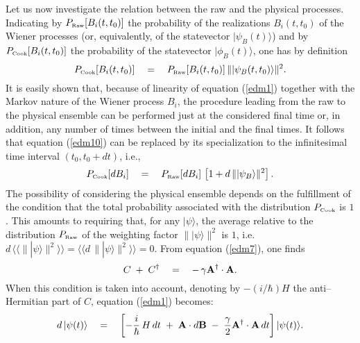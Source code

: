\documentclass[10pt,a4paper]{article}
\newcommand{\llangle}{\langle\!\langle}
\newcommand{\rrangle}{\rangle\!\rangle}
\begin{document}
Let us now investigate the relation between the raw and the
physical processes. Indicating by $P_{\makebox{\tiny
Raw}}[B_{i}(t, t_{0})]$ the probability of the realizations
$B_{i}(t, t_{0})$ of the Wiener processes (or, equivalently, of
the statevector $|\psi_{B}(t)\rangle$) and by $P_{\makebox{\tiny
Cook}}[B_{i}(t,t_{0})]$ the probability of the statevector
$|\phi_{B}(t)\rangle$, one has by definition
\begin{equation} \label{edm10}
P_{\makebox{\tiny Cook}}[B_{i}(t,t_{0})] \quad = \quad
P_{\makebox{\tiny Raw}}[B_{i}(t, t_{0})]\, \| |\psi_{B}(t,
t_{0})\rangle\|^{2}.
\end{equation}
It is easily shown that, because of linearity of equation
(\ref{edm1}) together with the Markov nature of the Wiener process
$B_{i}$, the procedure leading from the raw to the physical
ensemble can be performed just at the considered final time or, in
addition, any number of times between the initial and the final
times. It follows that equation (\ref{edm10}) can be replaced by
its specialization to the infinitesimal time interval $(t_{0},
t_{0} + dt)$, i.e.,
\begin{equation} \label{edm8}
P_{\makebox{\tiny Cook}}[dB_{i}] \quad = \quad P_{\makebox{\tiny
Raw}}[dB_{i}]\, \left[ 1 + d\, \| |\psi_{B}\rangle\|^{2} \right].
\end{equation}
The possibility of considering the physical ensemble depends on
the fulfillment of the condition that the total probability
associated with the distribution $P_{\makebox{\tiny Cook}}$ is
$1$. This amounts to requiring that, for any $|\psi\rangle$, the
average relative to the distribution $P_{\makebox{\tiny Raw}}$ of
the weighting factor $\| |\psi\rangle \|^2$ is $1$, i.e. $d \,
\llangle\| |\psi\rangle \|^2\rrangle = \llangle d \, \|
|\psi\rangle \|^2\rrangle = 0$. From equation (\ref{edm7}), one
finds
\begin{equation} \label{aqnld}
C\; + \; C^{\dagger} \quad = \quad -\, \gamma {\bf
A}^{\dagger}\cdot {\bf A}.
\end{equation}
When this condition is taken into account, denoting by
$-(i/\hbar)H$ the anti--Hermitian part of $C$, equation
(\ref{edm1}) becomes:
\begin{equation} \label{imef}
d\, |\psi(t)\rangle \quad = \quad \left[ -\frac{i}{\hbar}\, H\,dt
\; + \; {\bf A}\cdot d{\bf B} \; - \; \frac{\gamma}{2} {\bf
A}^{\dagger}\cdot {\bf A}\,dt \right] |\psi(t)\rangle.
\end{equation}
\end{document}
